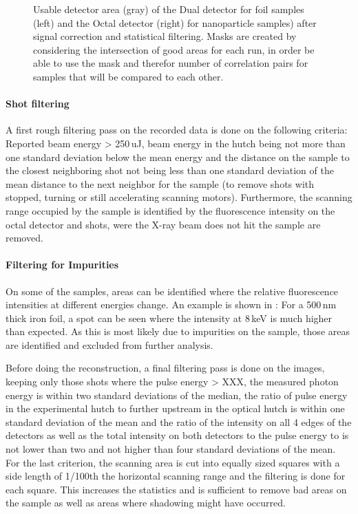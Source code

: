 \begin{figure}
\begin{subfigure}{0.2\textwidth}
	\end{subfigure}
	\caption[Usable detector area]{Usable detector area (gray) of the Dual detector for foil samples (left) and the Octal detector (right) for nanoparticle samples) after signal correction and statistical filtering. Masks are created by considering the intersection of good areas for each run, in order be able to use the mask and therefor number of correlation pairs for samples that will be compared to each other.}	
\end{figure}

\paragraph{Shot filtering}
A first rough filtering pass on the recorded data is done on the following criteria: Reported beam energy > 250\,uJ, beam energy in the hutch being not more than one standard deviation below the mean energy and the distance on the sample to the closest neighboring shot not being less than one standard deviation of the mean distance to the next neighbor for the sample (to remove shots with stopped, turning or still accelerating scanning motors). Furthermore, the scanning range occupied by the sample is identified by the fluorescence intensity on the octal detector and shots, were the X-ray beam does not hit the sample are removed.

 
\paragraph{Filtering for Impurities}
On some of the samples, areas can be identified where the relative fluorescence intensities at different energies change. An example is shown in : For a 500\,nm thick iron foil, a spot can be seen where the intensity at 8\,keV is much higher than expected. As this is most likely due to impurities on the sample, those areas are identified and excluded from further analysis.

Before doing the reconstruction, a final filtering pass is done on the images, keeping only those shots where the pulse energy > XXX, the measured photon energy is within two standard deviations of the median,
the ratio of pulse energy in the experimental hutch to further upstream in the optical hutch is within one standard deviation of the mean and the ratio of the intensity on all 4 edges of the detectors as well as  the total intensity on both detectors  to the pulse energy to is not lower than two and not higher than four standard deviations of the mean.
For the last criterion, the scanning area is cut into equally sized squares with a side length of 1/100th the horizontal scanning range and the filtering is done for each square. This increases the statistics and is sufficient to remove bad areas on the sample as well as areas where shadowing might have occurred.

